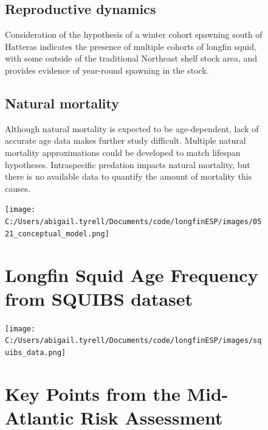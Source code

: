 \documentclass[
  9pt,
  letterpaper,
  DIV=11,
  numbers=noendperiod]{scrartcl}
\begin{document}
\begin{figure}
\begin{minipage}{0.57\linewidth}
\vspace{0.25cm}

\subsection{Reproductive dynamics}

Consideration of the hypothesis of a winter cohort spawning south of
Hatteras indicates the presence of multiple cohorts of longfin squid,
with some outside of the traditional Northeast shelf stock area, and
provides evidence of year-round spawning in the stock.

\vspace{0.25cm}

\subsection{Natural mortality}

Although natural mortality is expected to be age-dependent, lack of
accurate age data makes further study difficult. Multiple natural
mortality approximations could be developed to match lifespan
hypotheses. Intraspecific predation impacts natural mortality, but there
is no available data to quantify the amount of mortality this causes.

\vspace{0.5cm}

\texttt{[image: C:/Users/abigail.tyrell/Documents/code/longfinESP/images/0521\_conceptual\_model.png]}

\end{minipage}%
%
\begin{minipage}{0.03\linewidth}

\hfill

\end{minipage}%
%
\begin{minipage}{0.40\linewidth}

\vspace{0.5cm}
\section{Longfin Squid Age Frequency from SQUIBS dataset}

\texttt{[image: C:/Users/abigail.tyrell/Documents/code/longfinESP/images/squibs\_data.png]}

\vspace{0.25cm}

\section{Key Points from the Mid-Atlantic Risk Assessment}


\end{minipage}
\end{figure}
\end{document}
